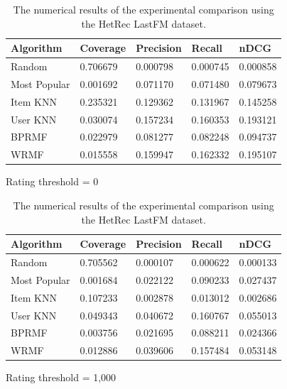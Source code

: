 \begin{table}
\begin{subfigure}{\textwidth}
\centering
\begin{tabular}{@{}lllll@{}}
\toprule
Algorithm & Coverage & Precision & Recall & nDCG \\ \midrule
Random & 0.706679 & 0.000798 & 0.000745 & 0.000858 \\
Most Popular & 0.001692 & 0.071170 & 0.071480 & 0.079673 \\
Item KNN & 0.235321 & 0.129362 & 0.131967 & 0.145258 \\
User KNN & 0.030074 & 0.157234 & 0.160353 & 0.193121 \\
BPRMF & 0.022979 & 0.081277 & 0.082248 & 0.094737 \\
WRMF & 0.015558 & 0.159947 & 0.162332 & 0.195107 \\ \bottomrule
\end{tabular}
\caption{Rating threshold = 0}
\bigskip
\end{subfigure}
\begin{subfigure}{\textwidth}
\centering
\begin{tabular}{@{}lllll@{}}
\toprule
Algorithm & Coverage & Precision & Recall & nDCG \\ \midrule
Random & 0.705562 & 0.000107 & 0.000622 & 0.000133 \\
Most Popular & 0.001684 & 0.022122 & 0.090233 & 0.027437 \\
Item KNN & 0.107233 & 0.002878 & 0.013012 & 0.002686 \\
User KNN & 0.049343 & 0.040672 & 0.160767 & 0.055013 \\
BPRMF & 0.003756 & 0.021695 & 0.088211 & 0.024366 \\
WRMF & 0.012886 & 0.039606 & 0.157484 & 0.053148 \\ \bottomrule
\end{tabular}
\caption{Rating threshold = 1,000}
\end{subfigure}
\caption[Experimental comparison with LastFM]{The numerical results of the experimental comparison using the HetRec LastFM dataset.}
\label{viz:tab:experiment}
\end{table}


